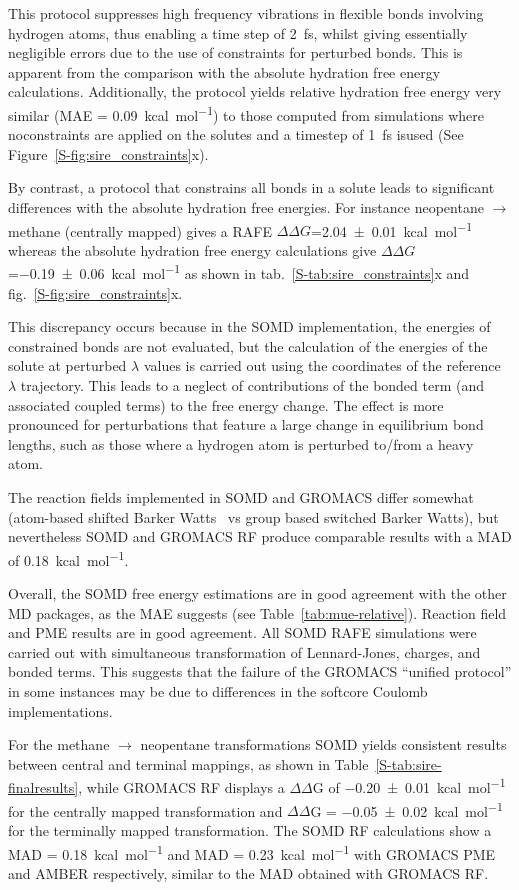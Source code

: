 \documentclass[journal=jctcce,manuscript=article]{achemso}
\begin{document}
This protocol suppresses high frequency vibrations in flexible bonds involving hydrogen atoms, thus enabling a time
step of \SI{2}{fs}, whilst giving essentially negligible errors due to the use of constraints for perturbed bonds.  This is apparent from the comparison with the absolute hydration free energy calculations.  Additionally, the protocol
yields relative hydration free energy very similar  (MAE =
\SI{0.09}{kcal.mol^{-1}}) to those computed from simulations where noconstraints are applied on the solutes and a timestep of \SI{1}{fs} isused (See Figure~\ref{S-fig:sire_constraints}x).

By contrast, a protocol that constrains all bonds in a solute leads to
significant differences with the absolute hydration free energies. For instance
neopentane $\rightarrow$ methane (centrally mapped) gives a RAFE
$\Delta\Delta G$=\SI{2.04 +- 0.01}{kcal.mol^{-1}}  whereas the absolute
hydration free energy calculations give $\Delta\Delta
G$=\SI{-0.19+-0.06}{kcal.mol^{-1}} as shown in
tab.~\ref{S-tab:sire_constraints}x and fig.~\ref{S-fig:sire_constraints}x.

This discrepancy occurs because in the SOMD implementation, the energies of constrained bonds are not evaluated, but the calculation of the energies of the solute at perturbed $\lambda$ values is carried out using the coordinates of the reference $\lambda$ trajectory. This leads to a neglect of contributions of
the bonded term (and associated coupled terms) to the free energy change. The effect is more pronounced for perturbations that feature a large change in equilibrium bond lengths, such as those where a hydrogen atom is perturbed
to/from a heavy atom.

The reaction fields implemented in SOMD and GROMACS differ somewhat (atom-based
shifted Barker Watts~\cite{doi:10.1080/00268977300102101} vs group based
switched Barker Watts), but nevertheless SOMD and GROMACS RF produce comparable results with a MAD of \SI{0.18}{kcal.mol^{-1}}.

Overall, the SOMD free energy estimations are in good agreement with the
other MD packages, as the MAE suggests (see Table~\ref{tab:mue-relative}).
Reaction field and PME
results are in good agreement.  All SOMD RAFE simulations were carried out with simultaneous transformation of Lennard-Jones, charges, and bonded terms. This suggests that the failure of the GROMACS ``unified protocol'' in some instances may be due to differences in the softcore Coulomb implementations.

For the methane $\rightarrow$ neopentane transformations SOMD yields consistent results between central and terminal mappings, as shown in
Table~\ref{S-tab:sire-finalresults}, while GROMACS RF displays a $\Delta\Delta$G
of \SI{-0.20 +-   0.01}{kcal.mol^{-1}} for the centrally mapped transformation
and $\Delta\Delta$G = \SI{-0.05 +- 0.02}{kcal.mol^{-1}} for the terminally
mapped transformation. The SOMD RF calculations show a MAD =
\SI{0.18}{kcal.mol^{-1}} and MAD = \SI{0.23}{kcal.mol^{-1}} with GROMACS PME
and AMBER respectively, similar to the MAD obtained with GROMACS RF.
\end{document}
